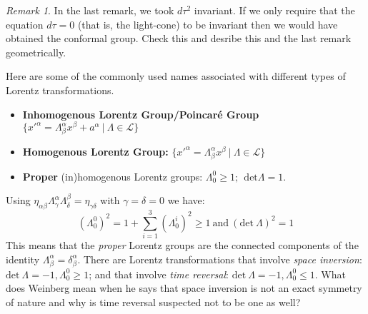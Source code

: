 \documentclass[11pt]{report}
\newcommand{\ms}{\mathscr}
\theoremstyle{plain}
\theoremstyle{definition}
\theoremstyle{remark}
\newtheorem{remark}{Remark}[section]
\newcommand{\gam}{\gamma}
\newcommand{\colr}[1]{ {\color{red}  #1 } }
\begin{document}
\begin{remark} In the last remark, we took $d\tau^2$ invariant. If we only
require that the equation $d\tau = 0$ (that is, the light-cone) to be
invariant then we would have obtained the conformal group. \colr{Check
this and desribe this and the last remark geometrically.}
\end{remark}

Here are some of the commonly used names associated with different types of
Lorentz transformations.
\begin{itemize}
    \item \textbf{Inhomogenous Lorentz Group/Poincar\'e Group} $\{x'^\alpha =
    \Lambda^\alpha_\beta x^\beta + a^\alpha\ |\ \Lambda\in\ms L\}$
    \item \textbf{Homogenous Lorentz Group:} $\{x'^\alpha =
    \Lambda^\alpha_\beta x^\beta\ |\ \Lambda\in\ms L\}$
    \item \textbf{Proper} (in)homogenous Lorentz groups: $\Lambda^0_0
        \ge1;\ \ \mathrm{det} \Lambda = 1$.
\end{itemize}
Using $\eta_{\alpha\beta}\Lambda^\alpha_\gam\Lambda^\beta_\delta =
\eta_{\gam\delta}$ with $\gam=\delta=0$ we have:
\[(\Lambda^0_0)^2 = 1+ \sum_{i=1}^3 (\Lambda^i_0)^2 \ge 1\ \text{and}\ 
(\mathrm{det}\ \Lambda)^2 = 1\]
This means that the \emph{proper} Lorentz groups are the connected
components of the identity $\Lambda^\alpha_\beta = \delta^\alpha_\beta$.
There are Lorentz transformations that involve \emph{space inversion}:
$\mathrm{det}\ \Lambda = -1, \Lambda^0_0 \ge1$; and that involve \emph{time
reversal}: $\mathrm{det}\ \Lambda = -1, \Lambda^0_0 \le 1$. \colr{What does
Weinberg mean when he says that space inversion is not an exact symmetry of
nature and why is time reversal suspected not to be one as well?}
\end{document}
